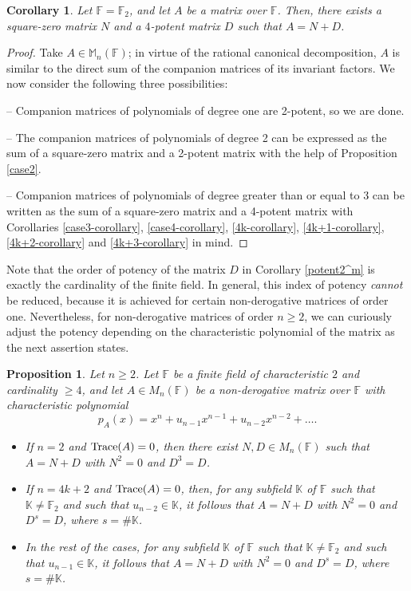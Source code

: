 \documentclass{amsart}
\def\FF{\mathbb{F}}
\def\KK{\mathbb{K}}
\newtheorem{proposition}[theorem]{Proposition}
\newtheorem{corollary}[theorem]{Corollary}
\theoremstyle{definition}
\theoremstyle{remark}
\numberwithin{equation}{section}
\begin{document}
\begin{corollary}\label{F2-potent}
Let $\FF=\FF_2$, and let $A$ be a matrix over $\FF$. Then, there exists a square-zero matrix $N$ and a $4$-potent matrix $D$ such that $A=N+D$.
\end{corollary}

\begin{proof}
Take $A\in\mathbb{M}_n(\mathbb{F})$; in virtue of the rational canonical decomposition, $A$ is similar to the direct sum of the companion matrices of its invariant factors. We now consider the following three possibilities:

\medskip

\noindent -- Companion matrices of polynomials of degree one are 2-potent, so we are done.

\medskip

\noindent -- The companion matrices of polynomials of degree 2 can be expressed as the sum of a square-zero matrix and a 2-potent matrix with the help of Proposition \ref{case2}.

\medskip

\noindent -- Companion matrices of polynomials of degree greater than or equal to 3 can be written as the sum of a square-zero matrix and a 4-potent matrix with Corollaries \ref{case3-corollary}, \ref{case4-corollary}, \ref{4k-corollary}, \ref{4k+1-corollary}, \ref{4k+2-corollary} and \ref{4k+3-corollary} in mind.
\end{proof}

Note that the order of potency of the matrix $D$ in Corollary \ref{potent2^m} is exactly the cardinality of the finite field. In general, this index of potency {\it cannot} be reduced, because it is achieved for certain non-derogative matrices of order one. Nevertheless, for non-derogative matrices of order $n\ge 2$, we can curiously adjust the potency depending on the characteristic polynomial of the matrix as the next assertion states.

\begin{proposition}\label{adjusting}
Let $n\ge 2$. Let $\FF$ be a finite field of characteristic $2$ and cardinality $\ge 4$, and let $A\in M_n(\FF)$ be a non-derogative matrix over $\FF$ with characteristic polynomial $$p_A(x)=x^n+u_{n-1}x^{n-1}+u_{n-2}x^{n-2}+\dots.$$
\begin{itemize}
 \item[(i)] If $n=2$ and ${\rm Trace}(A)=0$, then there exist $N,D\in M_n(\FF)$ such that $A=N+D$ with $N^2=0$ and $D^3=D$.
 \item[(ii)] If $n=4k+2$ and ${\rm Trace}(A)=0$, then, for any subfield $\KK$ of $\FF$ such that $\KK\ne \FF_2$ and such that $u_{n-2}\in \KK$, it follows that $A=N+D$ with $N^2=0$ and $D^s=D$, where $s=\# \KK$.
 \item[(iii)] In the rest of the cases, for any subfield $\KK$ of $\FF$ such that $\KK\ne \FF_2$ and such that $u_{n-1}\in \KK$, it follows that $A=N+D$ with $N^2=0$ and $D^s=D$, where $s=\# \KK$.
\end{itemize}
\end{proposition}
\end{document}
